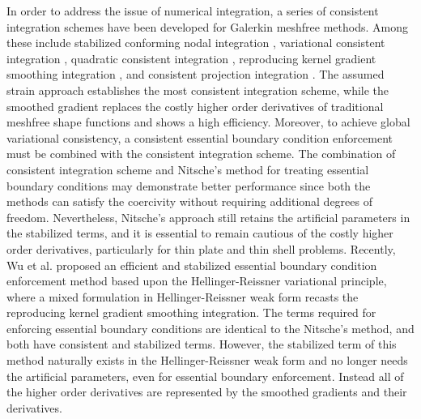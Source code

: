 In order to address the issue of numerical integration, a series of consistent integration schemes have been developed for Galerkin meshfree methods. Among these include stabilized conforming nodal integration \cite{chen2001} , variational consistent integration \cite{chen2013a}, quadratic consistent integration \cite{duan2012a}, reproducing kernel gradient smoothing integration \cite{wang2019a}, and consistent projection integration  \cite{wang2023}. The assumed strain approach establishes the most consistent integration scheme, while the smoothed gradient replaces the costly higher order derivatives of traditional meshfree shape functions and shows a high efficiency. Moreover, to achieve global variational consistency, a consistent essential boundary condition enforcement must be combined with the consistent integration scheme. The combination of consistent integration scheme and Nitsche’s method for treating essential boundary conditions may demonstrate better performance since both the methods can satisfy the coercivity without requiring additional degrees of freedom. Nevertheless, Nitsche's approach still retains the artificial parameters in the stabilized terms, and it is essential to remain cautious of the costly higher order derivatives, particularly for thin plate and thin shell problems. Recently, Wu et al. \cite{wu2022a,wu2023}  proposed an efficient and stabilized essential boundary condition enforcement method based upon the Hellinger-Reissner variational principle, where a mixed formulation in Hellinger-Reissner weak form recasts the reproducing kernel gradient smoothing integration. The terms required for enforcing essential boundary conditions are identical to the Nitsche’s method, and both have consistent and stabilized terms. However, the stabilized term of this method naturally exists in the Hellinger-Reissner weak form and no longer needs the artificial parameters, even for essential boundary enforcement. Instead all of the higher order derivatives are represented by the smoothed gradients and their derivatives.


